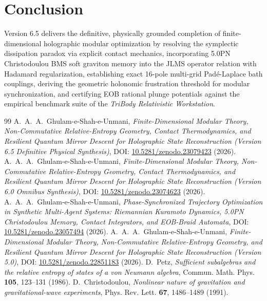 \documentclass[11pt,a4paper,reqno]{article}
\theoremstyle{definition}
\numberwithin{equation}{section}
\begin{document}
\section*{Conclusion}
Version 6.5 delivers the definitive, physically grounded completion of finite-dimensional holographic modular optimization by resolving the symplectic dissipation paradox via explicit contact mechanics, incorporating 5.0PN Christodoulou BMS soft graviton memory into the JLMS operator relation with Hadamard regularization, establishing exact 16-pole multi-grid Padé-Laplace bath couplings, deriving the geometric holonomic frustration threshold for modular synchronization, and certifying EOB rational plunge potentials against the empirical benchmark suite of the \textit{TriBody Relativistic Workstation}.

\begin{thebibliography}{99}
 A.~A.~A.~Ghulam-e-Shah-e-Unmani, \textit{Finite-Dimensional Modular Theory, Non-Commutative Relative-Entropy Geometry, Contact Thermodynamics, and Resilient Quantum Mirror Descent for Holographic State Reconstruction (Version 6.5 Definitive Physical Synthesis)}, DOI: \href{https://doi.org/10.5281/zenodo.23079423}{10.5281/zenodo.23079423} (2026).
 A.~A.~A.~Ghulam-e-Shah-e-Unmani, \textit{Finite-Dimensional Modular Theory, Non-Commutative Relative-Entropy Geometry, Contact Thermodynamics, and Resilient Quantum Mirror Descent for Holographic State Reconstruction (Version 6.0 Omnibus Synthesis)}, DOI: \href{https://doi.org/10.5281/zenodo.23074623}{10.5281/zenodo.23074623} (2026).
 A.~A.~A.~Ghulam-e-Shah-e-Unmani, \textit{Phase-Synchronized Trajectory Optimization in Synthetic Multi-Agent Systems: Riemannian Kuramoto Dynamics, 5.0PN Christodoulou Memory, Contact Integrators, and EOB-Braid Automata}, DOI: \href{https://doi.org/10.5281/zenodo.23057494}{10.5281/zenodo.23057494} (2026).
 A.~A.~A.~Ghulam-e-Shah-e-Unmani, \textit{Finite-Dimensional Modular Theory, Non-Commutative Relative-Entropy Geometry, and Resilient Quantum Mirror Descent for Holographic State Reconstruction (Version 5.0)}, DOI: \href{https://doi.org/10.5281/zenodo.22851183}{10.5281/zenodo.22851183} (2026).
 D.~Petz, \textit{Sufficient subalgebras and the relative entropy of states of a von Neumann algebra}, Commun. Math. Phys. \textbf{105}, 123--131 (1986).
 D.~Christodoulou, \textit{Nonlinear nature of gravitation and gravitational-wave experiments}, Phys. Rev. Lett. \textbf{67}, 1486--1489 (1991).

\end{thebibliography}
\end{document}
